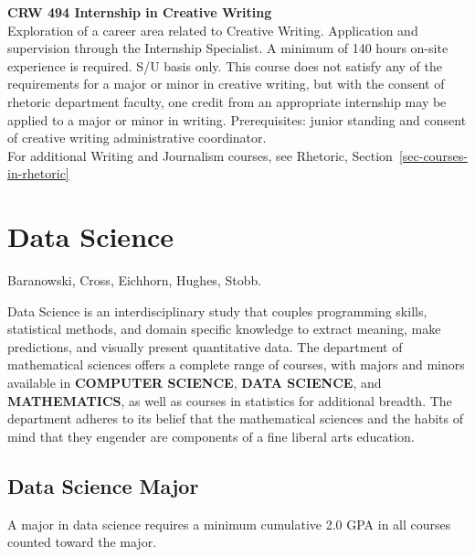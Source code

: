 \documentclass[
  letterpaper,
]{scrbook}
\begin{document}
\textbf{CRW 494 Internship in Creative Writing}\\
Exploration of a career area related to Creative Writing. Application
and supervision through the Internship Specialist. A minimum of 140
hours on-site experience is required. S/U basis only. This course does
not satisfy any of the requirements for a major or minor in creative
writing, but with the consent of rhetoric department faculty, one credit
from an appropriate internship may be applied to a major or minor in
writing. Prerequisites: junior standing and consent of creative writing
administrative coordinator.\\
For additional Writing and Journalism courses, see Rhetoric,
Section~\ref{sec-courses-in-rhetoric}

\section{Data Science}\label{sec-data-science}

Baranowski, Cross, Eichhorn, Hughes, Stobb.

Data Science is an interdisciplinary study that couples programming
skills, statistical methods, and domain specific knowledge to extract
meaning, make predictions, and visually present quantitative data. The
department of mathematical sciences offers a complete range of courses,
with majors and minors available in \textbf{COMPUTER SCIENCE},
\textbf{DATA SCIENCE}, and \textbf{MATHEMATICS}, as well as courses in
statistics for additional breadth. The department adheres to its belief
that the mathematical sciences and the habits of mind that they engender
are components of a fine liberal arts education.

\subsection{Data Science Major}\label{data-science-major}

A major in data science requires a minimum cumulative 2.0 GPA in all
courses counted toward the major.
\end{document}
